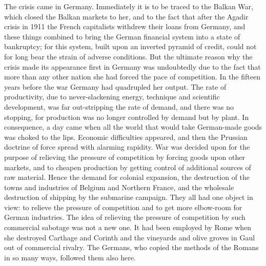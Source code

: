 \documentclass{book}
\begin{document}
The crisis came in Germany. Immediately it is to be traced to the Balkan War, which closed the Balkan markets to her, and to the fact that after the Agadir crisis in 1911 the French capitalists withdrew their loans from Germany, and these things combined to bring the German financial system into a state of bankruptcy; for this system, built upon an inverted pyramid of credit, could not for long bear the strain of adverse conditions. But the ultimate reason why the crisis made its appearance first in Germany was undoubtedly due to the fact that more than any other nation she had forced the pace of competition. In the fifteen years before the war Germany had quadrupled her output. The rate of productivity, due to never-slackening energy, technique and scientific development, was far out-stripping the rate of demand, and there was no stopping, for production was no longer controlled by demand but by plant. In consequence, a day came when all the world that would take German-made goods was choked to the lips. Economic difficulties appeared, and then the Prussian doctrine of force spread with alarming rapidity. War was decided upon for the purpose of relieving the pressure of competition by forcing goods upon other markets, and to cheapen production by getting control of additional sources of raw material. Hence the demand for colonial expansion, the destruction of the towns and industries of Belgium and Northern France, and the wholesale destruction of shipping by the submarine campaign. They all had one object in view: to relieve the pressure of competition and to get more elbow-room for German industries. The idea of relieving the pressure of competition by such commercial sabotage was not a new one. It had been employed by Rome when she destroyed Carthage and Corinth and the vineyards and olive groves in Gaul out of commercial rivalry. The Germans, who copied the methods of the Romans in so many ways, followed them also here.
\end{document}
